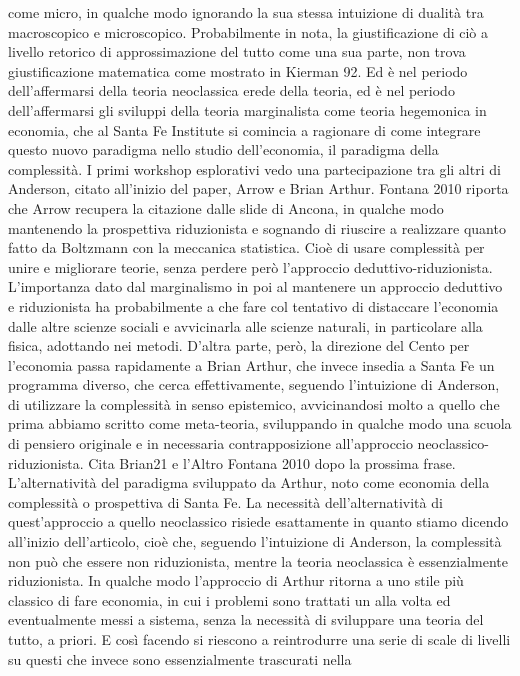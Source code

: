 \documentclass[a4paper, headings=standardclasses]{scrartcl}
\begin{document}
come micro, in qualche modo ignorando la sua stessa intuizione di dualità tra macroscopico
e microscopico. Probabilmente in nota, la giustificazione di ciò a livello retorico
di approssimazione del tutto come una sua parte, non trova giustificazione matematica
come mostrato in Kierman 92. Ed è nel periodo dell'affermarsi della teoria neoclassica
erede della teoria, ed è nel periodo dell'affermarsi gli sviluppi della teoria marginalista come
teoria hegemonica in economia, che al Santa Fe Institute si comincia a ragionare di come
integrare questo nuovo paradigma nello studio dell'economia, il paradigma della complessità.
I primi workshop esplorativi vedo una partecipazione tra gli altri di Anderson, citato all'inizio
del paper, Arrow e Brian Arthur. Fontana 2010 riporta che Arrow recupera la citazione
dalle slide di Ancona, in qualche modo mantenendo la prospettiva riduzionista e sognando di riuscire
a realizzare quanto fatto da Boltzmann con la meccanica statistica. Cioè di usare
complessità per unire e migliorare teorie, senza perdere però l'approccio deduttivo-riduzionista.
L'importanza dato dal marginalismo in poi al mantenere un approccio deduttivo e riduzionista
ha probabilmente a che fare col tentativo di distaccare l'economia dalle altre scienze
sociali e avvicinarla alle scienze naturali, in particolare alla fisica, adottando nei metodi.
D'altra parte, però, la direzione del Cento per l'economia passa rapidamente a Brian Arthur,
che invece insedia a Santa Fe un programma diverso, che cerca effettivamente, seguendo
l'intuizione di Anderson, di utilizzare la complessità in senso epistemico, avvicinandosi
molto a quello che prima abbiamo scritto come meta-teoria, sviluppando in qualche modo una
scuola di pensiero originale e in necessaria contrapposizione all'approccio neoclassico-riduzionista.
Cita Brian21 e l'Altro Fontana 2010 dopo la prossima frase.
L'alternatività del paradigma sviluppato da Arthur, noto come economia della complessità
o prospettiva di Santa Fe. La necessità dell'alternatività di quest'approccio a quello neoclassico risiede
esattamente in quanto stiamo dicendo all'inizio dell'articolo, cioè che, seguendo l'intuizione
di Anderson, la complessità non può che essere non riduzionista, mentre la teoria neoclassica è essenzialmente riduzionista.
In qualche modo l'approccio di Arthur ritorna a uno stile più classico di fare economia,
in cui i problemi sono trattati un alla volta ed eventualmente messi a sistema, senza la
necessità di sviluppare una teoria del tutto, a priori. E così facendo si riescono a reintrodurre
una serie di scale di livelli su questi che invece sono essenzialmente trascurati nella
\end{document}

